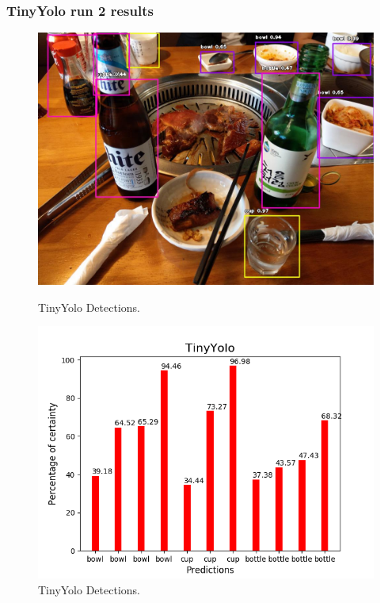       \subsubsection{TinyYolo run 2 results}

    \begin{figure}[htb]
        \centering
        \begin{minipage}[b]{0.44\textwidth}
          \includegraphics[width=\textwidth]{Sections/4InitialWork/4_images_obj_run2/yolo_tiny.jpg}
          \caption{TinyYolo Detections.}
        \end{minipage}
        \hfill
        \begin{minipage}[b]{0.50\textwidth}
          \includegraphics[width=\textwidth]{Sections/4InitialWork/4_images_obj_run2/yolo_tiny_graph.png}
          \caption{TinyYolo Detections.}
        \end{minipage}
      \end{figure}

